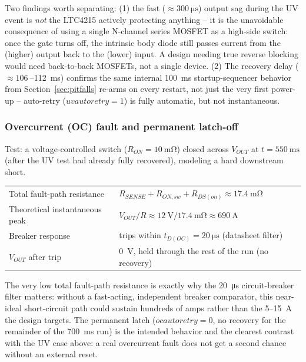 \documentclass[11pt,letterpaper]{article}
\begin{document}
Two findings worth separating: (1) the fast ($\approx\SI{300}{\micro\second}$) output sag during the UV
event is \emph{not} the LTC4215 actively protecting anything -- it is the unavoidable consequence of using
a single N-channel series MOSFET as a high-side switch: once the gate turns off, the intrinsic body diode
still passes current from the (higher) output back to the (lower) input. A design needing true reverse
blocking would need back-to-back MOSFETs, not a single device. (2) The recovery delay
($\approx\SI{106}{}$--\SI{112}{\milli\second}) confirms the same internal \SI{100}{\milli\second}
startup-sequencer behavior from Section~\ref{sec:pitfalls} re-arms on every restart, not just the very
first power-up -- auto-retry ($uvautoretry=1$) is fully automatic, but not instantaneous.

\subsubsection{Overcurrent (OC) fault and permanent latch-off}

Test: a voltage-controlled switch ($R_{ON}=\SI{10}{\milli\ohm}$) closed across $V_{OUT}$ at
$t=\SI{550}{\milli\second}$ (after the UV test had already fully recovered), modeling a hard downstream
short.

\begin{center}
\begin{tabular}{@{}ll@{}}
\toprule
Total fault-path resistance & $R_{SENSE}+R_{ON,sw}+R_{DS(on)}\approx\SI{17.4}{\milli\ohm}$ \\
Theoretical instantaneous peak & $V_{OUT}/R\approx\SI{12}{\volt}/\SI{17.4}{\milli\ohm}\approx\SI{690}{\ampere}$ \\
Breaker response & trips within $t_{D(OC)}=\SI{20}{\micro\second}$ (datasheet filter) \\
$V_{OUT}$ after trip & \SI{0}{\volt}, held through the rest of the run (no recovery) \\
\bottomrule
\end{tabular}
\end{center}

The very low total fault-path resistance is exactly why the \SI{20}{\micro\second} circuit-breaker filter
matters: without a fast-acting, independent breaker comparator, this near-ideal short-circuit path could
sustain hundreds of amps rather than the \SI{5}{}--\SI{15}{\ampere} the design targets. The permanent
latch ($ocautoretry=0$, no recovery for the remainder of the \SI{700}{\milli\second} run) is the intended
behavior and the clearest contrast with the UV case above: a real overcurrent fault does not get a second
chance without an external reset.
\end{document}
